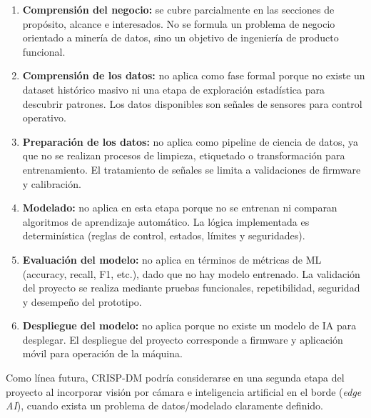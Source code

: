 ﻿\documentclass[
11pt, %
]{charter}
\begin{document}
\begin{enumerate}
  \item \textbf{Comprensión del negocio:} se cubre parcialmente en las secciones de propósito, alcance e interesados. No se formula un problema de negocio orientado a minería de datos, sino un objetivo de ingeniería de producto funcional.
  \item \textbf{Comprensión de los datos:} no aplica como fase formal porque no existe un dataset histórico masivo ni una etapa de exploración estadística para descubrir patrones. Los datos disponibles son señales de sensores para control operativo.
  \item \textbf{Preparación de los datos:} no aplica como pipeline de ciencia de datos, ya que no se realizan procesos de limpieza, etiquetado o transformación para entrenamiento. El tratamiento de señales se limita a validaciones de firmware y calibración.
  \item \textbf{Modelado:} no aplica en esta etapa porque no se entrenan ni comparan algoritmos de aprendizaje automático. La lógica implementada es determinística (reglas de control, estados, límites y seguridades).
  \item \textbf{Evaluación del modelo:} no aplica en términos de métricas de ML (accuracy, recall, F1, etc.), dado que no hay modelo entrenado. La validación del proyecto se realiza mediante pruebas funcionales, repetibilidad, seguridad y desempeño del prototipo.
  \item \textbf{Despliegue del modelo:} no aplica porque no existe un modelo de IA para desplegar. El despliegue del proyecto corresponde a firmware y aplicación móvil para operación de la máquina.
\end{enumerate}

Como línea futura, CRISP-DM podría considerarse en una segunda etapa del proyecto al incorporar visión por cámara e inteligencia artificial en el borde (\textit{edge AI}), cuando exista un problema de datos/modelado claramente definido.
\end{document}

